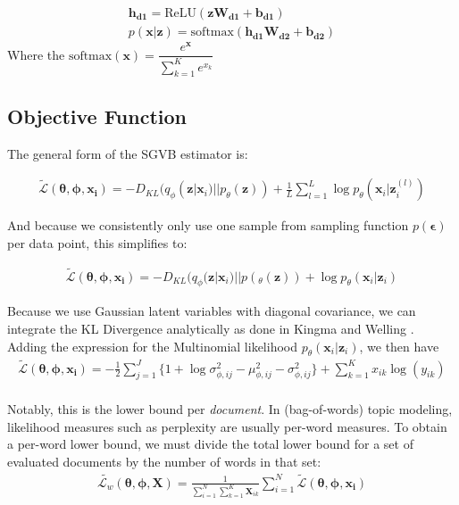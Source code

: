 \documentclass{report}
\begin{document}
\begin{align}
\mathbf{h_{d1}} = \text{ReLU}(\mathbf{zW_{d1}+b_{d1}})
\\
p(\mathbf{x}|\mathbf{z}) = \text{softmax} (\mathbf{h_{d1}W_{d2}}+\mathbf{b_{d2}})
\end{align}
Where the $\text{softmax}(\mathbf{x}) = \dfrac{e^{\mathbf{x}}}{\sum_{k=1}^{K}e^{x_k}}$


\subsection{Objective Function}
The general form of the SGVB estimator is:

\begin{align}
\tilde{\mathcal{L}}(\boldsymbol{\theta}, \boldsymbol{\phi}, \mathbf{x_i}) = -D_{KL}(q_\phi (\mathbf{z}|\mathbf{x}_i)||p_\theta(\mathbf{z}))  + \frac{1}{L}\sum_{l=1}^{L}\log p_\theta(\mathbf{x}_i|\mathbf{z}_i^{(l)})
\end{align}

And because we consistently only use one sample from sampling function $p(\boldsymbol{\epsilon})$ per data point, this simplifies to:

\begin{align}\label{lb_summary}
\tilde{\mathcal{L}}(\boldsymbol{\theta}, \boldsymbol{\phi}, \mathbf{x_i}) = -D_{KL}(q_\phi (\mathbf{z}|\mathbf{x}_i)||p(_\theta(\mathbf{z}))  + \log p_\theta(\mathbf{x}_i|\mathbf{z}_i)
\end{align}

Because we use Gaussian latent variables with diagonal covariance, we can integrate the KL Divergence analytically as done in Kingma and Welling \cite{kingma2013auto}. Adding the expression for the Multinomial likelihood $p_\theta(\mathbf{x}_i|\mathbf{z}_i)$, we then have
\begin{align}\label{LBest}
\tilde{\mathcal{L}}(\boldsymbol{\theta}, \boldsymbol{\phi}, \mathbf{x_i}) = - \frac{1}{2}\sum\limits_{j=1}^{J}\{1+\log \sigma_{\phi ,ij}^2 - \mu_{\phi,ij}^2 - \sigma_{\phi ,ij}^2\}  + 
\sum_{k=1}^K x_{ik} \log (y_{ik})
\end{align}
\\
Notably, this is the lower bound per \textit{document}. In (bag-of-words) topic modeling, likelihood measures such as perplexity are usually per-word measures. To obtain a per-word lower bound, we must divide the total lower bound for a set of evaluated documents by the number of words in that set: 
\begin{align}\label{perwordLBest}
\tilde{\mathcal{L}_w}(\boldsymbol{\theta}, \boldsymbol{\phi}, \mathbf{X}) = \frac{1}{\sum\limits_{i=1}^{N}\sum\limits_{k=1}^{K}\mathbf{X}_{ik}}\sum\limits_{i=1}^N \tilde{\mathcal{L}}(\boldsymbol{\theta}, \boldsymbol{\phi}, \mathbf{x_i})
\end{align}
\end{document}
